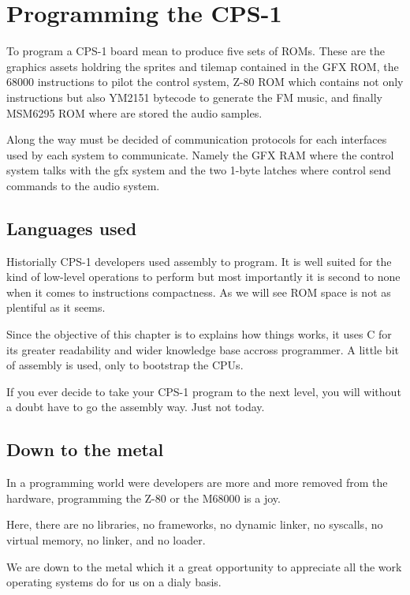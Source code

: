 \chapter{Programming the CPS-1}

To program a CPS-1 board mean to produce five sets of ROMs. These are the graphics assets holdring the sprites and tilemap contained in the GFX ROM, the 68000 instructions to pilot the control system, Z-80 ROM which contains not only instructions but also YM2151 bytecode to generate the FM music, and finally MSM6295 ROM where are stored the audio samples.


Along the way must be decided of communication protocols for each interfaces used by each system to communicate. Namely the GFX RAM where the control system talks with the gfx system and the two 1-byte latches where control send commands to the audio system.

\pagebreak

\section{Languages used}
Historially CPS-1 developers used assembly to program. It is well suited for the kind of low-level operations to perform but most importantly it is second to none when it comes to instructions compactness. As we will see ROM space is not as plentiful as it seems.

Since the objective of this chapter is to explains how things works, it uses C for its greater readability and wider knowledge base accross programmer. A little bit of assembly is used, only to bootstrap the CPUs.

If you ever decide to take your CPS-1 program to the next level, you will without a doubt have to go the assembly way. Just not today.

\section{Down to the metal}
In a programming world were developers are more and more removed from the hardware, programming the Z-80 or the M68000 is a joy.

Here, there are no libraries, no frameworks, no dynamic linker, no syscalls, no virtual memory, no linker, and no loader.

We are down to the metal which it a great opportunity to appreciate all the work operating systems do for us on a dialy basis.


